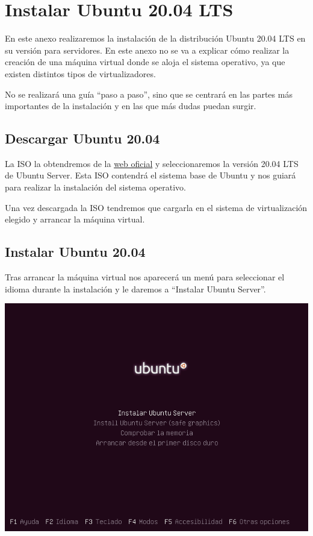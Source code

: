 \hypertarget{instalar_ubuntu_lts}{}

\chapter{Instalar Ubuntu 20.04 LTS}
En este anexo realizaremos la instalación de la distribución Ubuntu 20.04 LTS en su versión para servidores. En este anexo no se va a explicar cómo realizar la creación de una máquina virtual donde se aloja el sistema operativo, ya que existen distintos tipos de virtualizadores.

No se realizará una guía “paso a paso”, sino que se centrará en las partes más importantes de la instalación y en las que más dudas puedan surgir.

\section{Descargar Ubuntu 20.04}
La ISO la obtendremos de la \href{https://ubuntu.com/#download}{web oficial} y seleccionaremos la versión 20.04 LTS de Ubuntu Server. Esta ISO contendrá el sistema base de Ubuntu y nos guiará para realizar la instalación del sistema operativo.

Una vez descargada la ISO tendremos que cargarla en el sistema de virtualización elegido y arrancar la máquina virtual.


\section{Instalar Ubuntu 20.04}
Tras arrancar la máquina virtual nos aparecerá un menú para seleccionar el idioma durante la instalación y le daremos a “Instalar Ubuntu Server”.

\begin{center}
    \vspace{-10pt}
    \includegraphics[width=15cm]{ubuntu_1.png}
    \vspace{-20pt}
\end{center}


